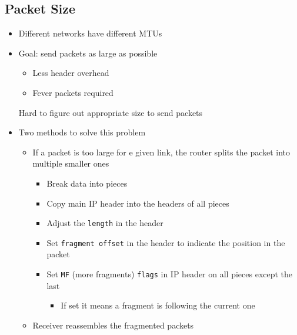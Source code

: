 \subsection{Packet Size}
\begin{itemize}
        \begin{itemize}
            \item Maximal allowed packet size
        \end{itemize}
    \item Different networks have different MTUs
    \item Goal: send packets as large as possible
        \begin{itemize}
            \item Less header overhead
            \item Fever packets required
        \end{itemize}
    \icon Hard to figure out appropriate size to send packets
    \item Two methods to solve this problem
        \begin{itemize}
                \begin{itemize}
                    \item If a packet is too large for e given link, the router splits the packet into multiple smaller ones
                        \begin{itemize}
                            \item Break data into pieces
                            \item Copy main IP header into the headers of all pieces
                            \item Adjust the \verb+length+ in the header
                            \item Set \verb+fragment offset+ in the header to indicate the position in the packet
                            \item Set \verb+MF+ (more fragments) \verb+flags+ in IP header on all pieces except the last
                                \begin{itemize}
                                    \item If set it means a fragment is following the current one
                                \end{itemize}
                        \end{itemize}
                    \item Receiver reassembles the fragmented packets

\end{itemize}
\end{itemize}
\end{itemize}
